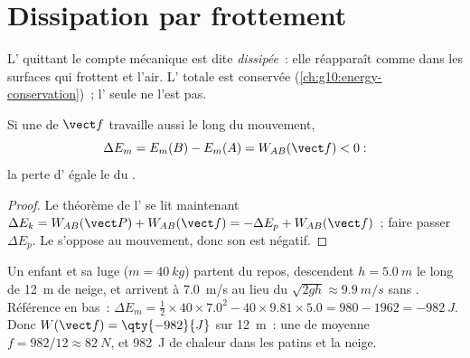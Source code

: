 \section{Dissipation par frottement}

\begin{definition}[Dissipation]\label{def:g11:mechanical-energy:dissipation}
L' quittant le compte
mécanique est dite \emph{dissipée}~: elle réapparaît
comme  dans les
surfaces qui frottent et l'air. L'
 totale est conservée
(\cref{ch:g10:energy-conservation})~; l'
 seule ne l'est pas.
\end{definition}

\begin{proposition}\label{prop:g11:mechanical-energy:deficit}
Si une  de
 $\vect f$
travaille aussi le long du mouvement,
\[
\Delta E_m = E_m(B) - E_m(A) = W_{AB}(\vect f) < 0:
\]
la perte d' égale le
 du
.
\end{proposition}

\begin{proof}
Le théorème de l' se lit maintenant $\Delta E_k = W_{AB}(\vect P) +
W_{AB}(\vect f) = -\Delta E_p + W_{AB}(\vect f)$~; faire passer
$\Delta E_p$. Le  s'oppose au
mouvement, donc son  est négatif.
\end{proof}

\begin{example}\label{ex:g11:mechanical-energy:toboggan}
Un enfant et sa luge ($m = \qty{40}{kg}$) partent du repos, descendent
$h = \qty{5.0}{m}$ le long de \qty{12}{m} de neige, et arrivent à
\qty{7.0}{m/s} au lieu du $\sqrt{2gh} \approx \qty{9.9}{m/s}$ sans
. Référence en bas~: $\Delta E_m = \tfrac12 \times 40 \times
7.0^2 - 40 \times 9.81 \times 5.0 = 980 - 1962 = \qty{-982}{J}$. Donc
$W(\vect f) = \qty{-982}{J}$ sur \qty{12}{m}~: une
 de
 moyenne
$f = 982/12 \approx \qty{82}{N}$, et \qty{982}{J} de chaleur dans les
patins et la neige.
\end{example}

